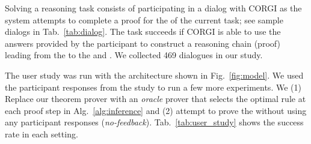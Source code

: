 Solving a reasoning task consists of participating in a dialog with CORGI  as the system attempts to complete a proof for the \textGoal of the current task; 
see sample dialogs in Tab.~\ref{tab:dialog}. The task succeeds if CORGI is able to use the answers provided by the participant to construct a reasoning chain (proof) leading from the \textGoal to the \textState and \textAction.
We collected 469 dialogues in our study.

The user study was run with the architecture shown in Fig.~\ref{fig:model}. 
We used the participant responses from the study to run a few more experiments. We (1) Replace our theorem prover with an \emph{oracle} prover that selects the optimal rule at each proof step in Alg.~\ref{alg:inference} and (2) attempt to prove the \textGoal without using any participant responses (\emph{no-feedback}). Tab.~\ref{tab:user_study} shows the success rate in each setting. %





